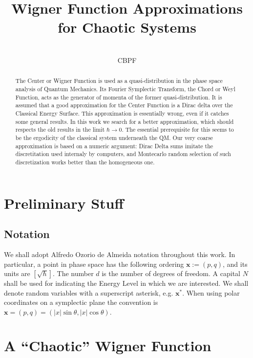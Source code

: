 \documentclass[a4paper,12pt]{article}
\title{ Wigner Function Approximations for Chaotic Systems}
\author{\\CBPF}
\newcommand{\xfase}{\mathbf{x}}
\begin{document}
\maketitle

\begin{abstract}


The Center or Wigner Function is used as a quasi-distribution in 
the phase space analysis
of Quantum Mechanics. Its Fourier Symplectic Transform, 
the Chord or Weyl Function, 
acts as the generator of momenta of the former 
 quasi-distribution. It is
assumed that a good approximation for the Center Function
 is a Dirac delta over
the Classical Energy Surface. This approximation is essentially wrong,
even if it catches some general results.
In this work we search for a better approximation, which
should respects the old results in the limit $\hbar\rightarrow 0$.
The essential prerequisite for this seems to be the ergodicity of
the classical system underneath the QM.
Our very coarse approximation is based on a 
numeric argument: Dirac Delta sums imitate the discretitation
used internaly by computers, and Montecarlo random 
selection of such discretization works better than the 
homogeneous one. 

\end{abstract}

\section{Preliminary Stuff}

\subsection{Notation}

We shall adopt Alfredo Ozorio de Almeida notation throughout this work. 
In particular, a point in phase space has the 
following ordering  $\xfase:=(p,q)$, and its units are $[\sqrt{\hbar}]$.
The number $d$ is the number of degrees of freedom. A capital $N$ shall
be used for indicating the Energy Level in which we are interested.
We shall denote random  variables with a superscript asterisk, e.g.
$\xfase^*$. When using polar coordinates on a symplectic plane
the convention is $\xfase=(p,q)=(|x|\sin\theta, |x|\cos\theta)$.

\section{A ``Chaotic'' Wigner Function}
\end{document}
